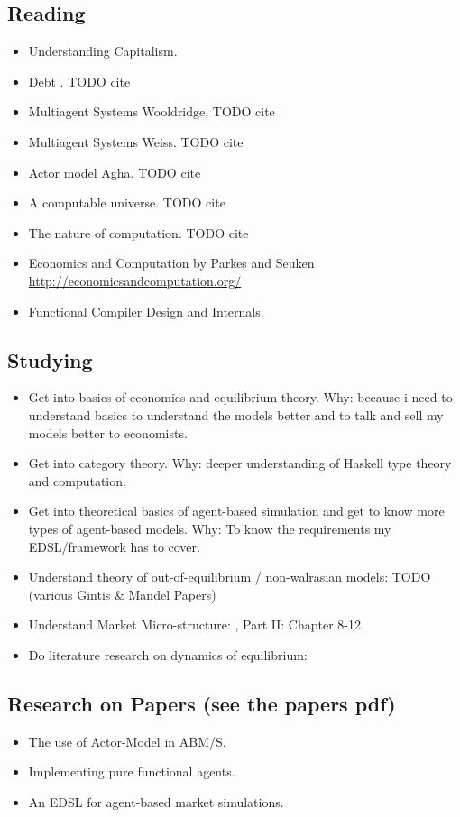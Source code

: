 \documentclass{article}
\begin{document}
\subsection{Reading}
\begin{itemize}
\item Understanding Capitalism. \cite{bowles_understanding_2005}
\item Debt . TODO cite
\item Multiagent Systems Wooldridge. TODO cite
\item Multiagent Systems Weiss. TODO cite
\item Actor model Agha. TODO cite
\item A computable universe. TODO cite
\item The nature of computation. TODO cite
\item Economics and Computation by Parkes and Seuken \url{http://economicsandcomputation.org/}
\item Functional Compiler Design and Internals.
\end{itemize}

\subsection{Studying}
\begin{itemize}
\item Get into basics of economics and equilibrium theory. Why: because i need to understand basics to understand the models better and to talk and sell my models better to economists.
\item Get into category theory. Why: deeper understanding of Haskell type theory and computation.
\item Get into theoretical basics of agent-based simulation and get to know more types of agent-based models. Why: To know the requirements my EDSL/framework has to cover.
\item Understand theory of out-of-equilibrium / non-walrasian models: TODO (various Gintis \& Mandel Papers)
\item Understand Market Micro-structure: \cite{LehalleLaruelle2013}, \cite{baker_market_2013} Part II: Chapter 8-12.
\item Do literature research on dynamics of equilibrium: \cite{emergent_2008}
\end{itemize}

\subsection{Research on Papers (see the papers pdf)}
\begin{itemize}
\item The use of Actor-Model in ABM/S.
\item Implementing pure functional agents.
\item An EDSL for agent-based market simulations.
\end{itemize}





\end{document}
